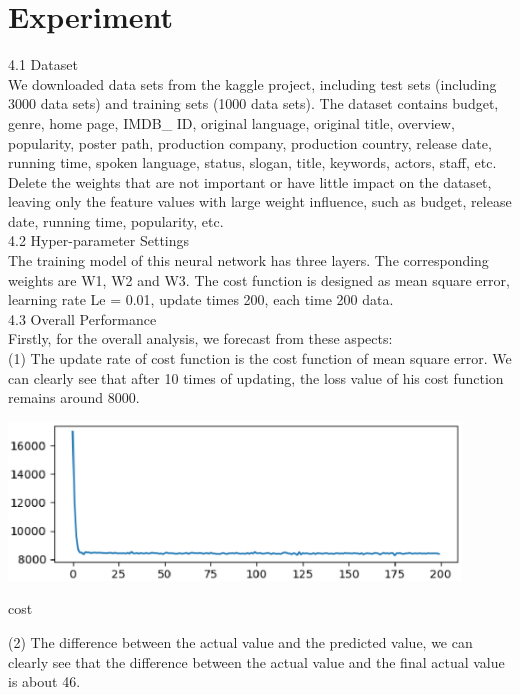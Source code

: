 \section{Experiment} \label{sec-experiment}
4.1 Dataset\\
We downloaded data sets from the kaggle project, including test sets (including 3000 data sets) and training sets (1000 data sets). The dataset contains budget, genre, home page, IMDB_ ID, original language, original title, overview, popularity, poster path, production company, production country, release date, running time, spoken language, status, slogan, title, keywords, actors, staff, etc. Delete the weights that are not important or have little impact on the dataset, leaving only the feature values with large weight influence, such as budget, release date, running time, popularity, etc.\\
4.2 Hyper-parameter Settings\\
The training model of this neural network has three layers. The corresponding weights are W1, W2 and W3. The cost function is designed as mean square error, learning rate Le = 0.01, update times 200, each time 200 data.\\
4.3 Overall Performance\\
Firstly, for the overall analysis, we forecast from these aspects:\\
(1) The update rate of cost function is the cost function of mean square error. We can clearly see that after 10 times of updating, the loss value of his cost function remains around 8000.\\
\begin{center}

  \begin{minipage}{0.3\linewidth}
  \centering

  \includegraphics[width=0.9\textwidth]{logos/1 (1).eps}
  
  {\small{cost}}

  \end{minipage}
\end{center}
(2) The difference between the actual value and the predicted value, we can clearly see that the difference between the actual value and the final actual value is about 46.
